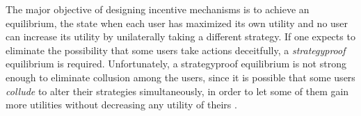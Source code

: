 \documentclass[conference]{IEEEtran}
\theoremstyle{definition}
\begin{document}
{\color{black}
The major objective of designing incentive mechanisms is to achieve an equilibrium, the state when each user has maximized its own utility and no user can increase its utility by unilaterally taking a different strategy. If one expects to eliminate the possibility that some users take actions deceitfully, a \emph{strategyproof} equilibrium is required. %
Unfortunately, a strategyproof equilibrium is not strong enough to eliminate collusion among the users, since it is possible that some users \emph{collude} to alter their strategies simultaneously, in order to let some of them gain more utilities without decreasing any utility of theirs \cite{zhong2007designing}. 


}
\end{document}
